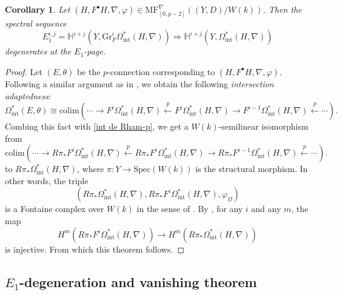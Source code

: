 \documentclass[12pt, a4paper]{article}
\newtheorem{corollary}{Corollary}[section]
\begin{document}
\begin{corollary}
  Let $(H,F^\bullet H,\nabla,\varphi)\in\mathrm{MF}^\nabla_{[0,p-2]}((Y,D)/W(k))$. Then the spectral sequence
  $$
  E^{i,j}_1=\mathbb H^{i+j}(Y,\mathrm{Gr}_F^i\Omega^*_\mathrm{int}(H,\nabla))\Rightarrow\mathbb H^{i+j}(Y,\Omega^*_\mathrm{int}(H,\nabla))
  $$
  degenerates at the $E_1$-page.
\end{corollary}
\begin{proof}
Let $(E,\theta)$ be the $p$-connection corresponding to $(H,F^\bullet H,\nabla,\varphi)$.
Following a similar argument as in \cite[Theorem 4.12]{SZ2}, we obtain the following \emph{intersection adaptedness}: 
$$
\Omega_\mathrm{int}^*(E,\theta)\cong\mathrm{colim}(\cdots\rightarrow F^i\Omega_\mathrm{int}^*(H,\nabla)\xleftarrow{p}F^i\Omega_\mathrm{int}^*(H,\nabla)\rightarrow F^{i-1}\Omega_\mathrm{int}^*(H,\nabla)\xleftarrow{p}\cdots).
$$
Combing this fact with \eqref{int de Rham-p}, we get a $W(k)$-semilinear isomorphism from 
$$
\mathrm{colim}(\cdots\rightarrow R\pi_*F^i\Omega_\mathrm{int}^*(H,\nabla)\xleftarrow{p}R\pi_*F^i\Omega_\mathrm{int}^*(H,\nabla)\rightarrow R\pi_*F^{i-1}\Omega_\mathrm{int}^*(H,\nabla)\xleftarrow{p}\cdots).
$$
to $R\pi_*\Omega_\mathrm{int}^*(H,\nabla)$, where $\pi:Y\to\mathrm{Spec}(W(k))$ is the structural morphism. In other words, 
the triple
$$(R\pi_*\Omega_\mathrm{int}^*(H,\nabla),R\pi_*F^i\Omega_\mathrm{int}^*(H,\nabla),\varphi_{\underline{\Omega}})$$
is a Fontaine complex over $W(k)$ in the sense of \cite[Definition 5.3.6]{Ogus}. By \cite[Corollary 5.3.7]{Ogus}, for any $i$ and any $m$, the map
$$
H^m(R\pi_*F^i\Omega_\mathrm{int}^*(H,\nabla))\to H^m(R\pi_*\Omega_\mathrm{int}^*(H,\nabla))
$$
is injective. From which this theorem follows. 
\end{proof}




\subsection{$E_1$-degeneration and vanishing theorem}
\end{document}
